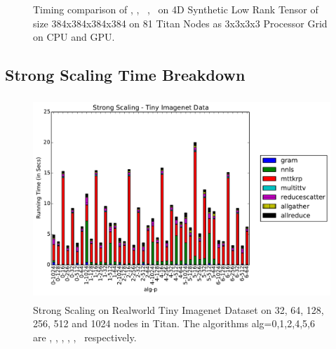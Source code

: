 \begin{figure}

\caption{Timing comparison of \MU, \HALS, \BPP\, \ADMM, \Nestrov\ on 4D Synthetic Low Rank Tensor of size 384x384x384x384 on 81 Titan Nodes as 3x3x3x3 Processor Grid on CPU and GPU.}
\label{fig:cpuvsgpulowrank}
\end{figure}



\subsection{Strong Scaling Time Breakdown}



\begin{figure}
\includegraphics[width=\textwidth, height=3in]{data/plots/ssrw_tinyimagenet_breakdown.pdf}
\caption {Strong Scaling on Realworld Tiny Imagenet Dataset on 32, 64, 128, 256, 512 and 1024 nodes in Titan. The algorithms alg=0,1,2,4,5,6 are \MU, \HALS, \BPP, \ADMM, \Nestrov, \CPALS\ respectively.}
\label{fig:synstrongscaling}
\end{figure}

